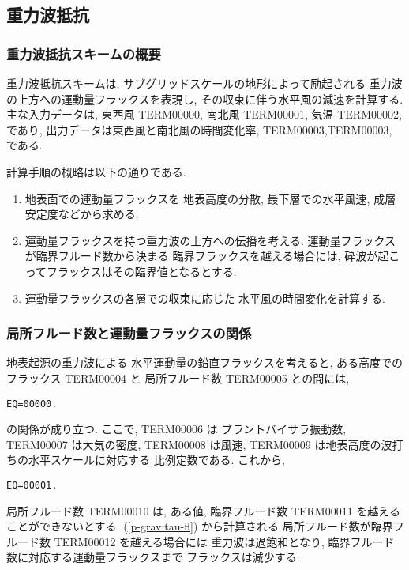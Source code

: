 ﻿
\subsection{重力波抵抗}

\subsubsection{重力波抵抗スキームの概要}

重力波抵抗スキームは,
サブグリッドスケールの地形によって励起される
重力波の上方への運動量フラックスを表現し,
その収束に伴う水平風の減速を計算する.
主な入力データは, 東西風 TERM00000, 南北風 TERM00001, 気温 TERM00002, であり,
出力データは東西風と南北風の時間変化率,
TERM00003,TERM00003, である.

計算手順の概略は以下の通りである.
%
\begin{enumerate}
\item 地表面での運動量フラックスを
      地表高度の分散, 
      最下層での水平風速, 成層安定度などから求める.
\item 運動量フラックスを持つ重力波の上方への伝播を考える.
      運動量フラックスが臨界フルード数から決まる
      臨界フラックスを越える場合には,
      砕波が起こってフラックスはその臨界値となるとする.
\item 運動量フラックスの各層での収束に応じた
      水平風の時間変化を計算する.
\end{enumerate}

\subsubsection{局所フルード数と運動量フラックスの関係}

地表起源の重力波による
水平運動量の鉛直フラックスを考えると,
ある高度でのフラックス TERM00004 と
局所フルード数 TERM00005 との間には,
\begin{verbatim}
EQ=00000.
\end{verbatim}
の関係が成り立つ.
ここで, TERM00006 は
ブラントバイサラ振動数, 
TERM00007 は大気の密度, 
TERM00008 は風速, TERM00009 は地表高度の波打ちの水平スケールに対応する
比例定数である.
これから,
\begin{verbatim}
EQ=00001.
\end{verbatim}

局所フルード数 TERM00010 は,
ある値, 臨界フルード数 TERM00011 を越えることができないとする.
(\ref{p-grav:tau-fl}) から計算される
局所フルード数が臨界フルード数 TERM00012 を越える場合には
重力波は過飽和となり,
臨界フルード数に対応する運動量フラックスまで
フラックスは減少する.

